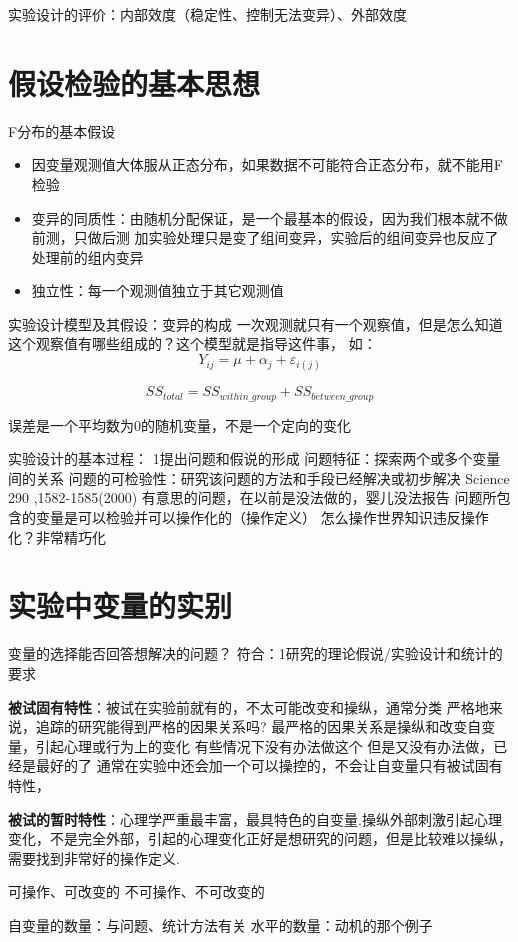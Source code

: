 实验设计的评价：内部效度（稳定性、控制无法变异）、外部效度

\section{假设检验的基本思想}
F分布的基本假设
\begin{itemize}
	\item 因变量观测值大体服从正态分布，如果数据不可能符合正态分布，就不能用F检验
	\item 变异的同质性：由随机分配保证，是一个最基本的假设，因为我们根本就不做前测，只做后测
	加实验处理只是变了组间变异，实验后的组间变异也反应了处理前的组内变异
	\item 独立性：每一个观测值独立于其它观测值 
\end{itemize}

实验设计模型及其假设：变异的构成
一次观测就只有一个观察值，但是怎么知道这个观察值有哪些组成的？这个模型就是指导这件事，
如：
$$
Y_{ij}=\mu +\alpha_j + \varepsilon_{i(j)}
$$

$$
SS_{total}=SS_{within\_group}+SS_{between\_group}
$$


误差是一个平均数为0的随机变量，不是一个定向的变化


实验设计的基本过程：
1提出问题和假说的形成
问题特征：探索两个或多个变量间的关系
问题的可检验性：研究该问题的方法和手段已经解决或初步解决
Science 290 ,1582-1585(2000) 有意思的问题，在以前是没法做的，婴儿没法报告
问题所包含的变量是可以检验并可以操作化的（操作定义）
怎么操作世界知识违反操作化？非常精巧化

\section{实验中变量的实别}
变量的选择能否回答想解决的问题？
符合：1研究的理论假说/实验设计和统计的要求

\textbf{被试固有特性}：被试在实验前就有的，不太可能改变和操纵，通常分类
严格地来说，追踪的研究能得到严格的因果关系吗?
最严格的因果关系是操纵和改变自变量，引起心理或行为上的变化
有些情况下没有办法做这个
但是又没有办法做，已经是最好的了
通常在实验中还会加一个可以操控的，不会让自变量只有被试固有特性，

\textbf{被试的暂时特性}：心理学严重最丰富，最具特色的自变量.操纵外部刺激引起心理变化，不是完全外部，引起的心理变化正好是想研究的问题，但是比较难以操纵，需要找到非常好的操作定义.

可操作、可改变的
不可操作、不可改变的

自变量的数量：与问题、统计方法有关
水平的数量：动机的那个例子

